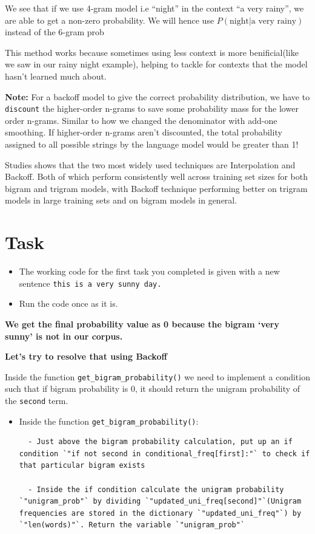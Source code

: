 \documentclass[11pt]{article}
\begin{document}
We see that if we use 4-gram model i.e ``night'' in the context ``a very
rainy'', we are able to get a non-zero probability. We will hence use
\(P(\text{night|a very rainy})\) instead of the 6-gram prob

This method works because sometimes using less context is more
benificial(like we saw in our rainy night example), helping to tackle
for contexts that the model hasn't learned much about.

\textbf{Note:} For a backoff model to give the correct probability
distribution, we have to \texttt{discount} the higher-order n-grams to
save some probability mass for the lower order n-grams. Similar to how
we changed the denominator with add-one smoothing. If higher-order
n-grams aren't discounted, the total probability assigned to all
possible strings by the language model would be greater than 1!

Studies shows that the two most widely used techniques are Interpolation
and Backoff. Both of which perform consistently well across training set
sizes for both bigram and trigram models, with Backoff technique
performing better on trigram models in large training sets and on bigram
models in general.

    \hypertarget{task}{%
\section{Task}\label{task}}

\begin{itemize}
\item
  The working code for the first task you completed is given with a new
  sentence \texttt{this\ is\ a\ very\ sunny\ day.}
\item
  Run the code once as it is.
\end{itemize}

\textbf{We get the final probability value as 0 because the bigram `very
sunny' is not in our corpus.}

\textbf{Let's try to resolve that using Backoff}

Inside the function \texttt{get\_bigram\_probability()} we need to
implement a condition such that if bigram probability is 0, it should
return the unigram probability of the \texttt{second} term.

\begin{itemize}
\item
  Inside the function \texttt{get\_bigram\_probability()}:

\begin{verbatim}
  - Just above the bigram probability calculation, put up an if condition `"if not second in conditional_freq[first]:"` to check if that particular bigram exists

  - Inside the if condition calculate the unigram probability `"unigram_prob"` by dividing `"updated_uni_freq[second]"`(Unigram frequencies are stored in the dictionary `"updated_uni_freq"`) by `"len(words)"`. Return the variable `"unigram_prob"`
\end{verbatim}
\end{itemize}
\end{document}
